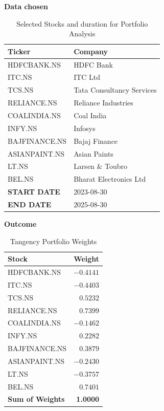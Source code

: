 \textbf{Data chosen}
\begin{table}[H]
        \centering
        \begin{tabular}{ll}
        \toprule
        \textbf{Ticker} & \textbf{Company} \\
        \midrule
        HDFCBANK.NS   & HDFC Bank \\
        ITC.NS        & ITC Ltd \\
        TCS.NS        & Tata Consultancy Services \\
        RELIANCE.NS   & Reliance Industries \\
        COALINDIA.NS  & Coal India \\
        INFY.NS       & Infosys \\
        BAJFINANCE.NS & Bajaj Finance \\
        ASIANPAINT.NS & Asian Paints \\
        LT.NS         & Larsen \& Toubro \\
        BEL.NS        & Bharat Electronics Ltd \\
        \midrule
        \textbf{START DATE} & 2023-08-30\\
        \textbf{END DATE} & 2025-08-30\\
        \bottomrule
    \end{tabular}
    \caption{Selected Stocks and duration for Portfolio Analysis}
\end{table}

\textbf{Outcome}

\begin{table}[H]
    \centering
    \begin{tabular}{lr}
        \toprule
        \textbf{Stock} & \textbf{Weight} \\
        \midrule
        HDFCBANK.NS     & $-0.4141$ \\
        ITC.NS          & $-0.4403$ \\
        TCS.NS          & $0.5232$ \\
        RELIANCE.NS     & $0.7399$ \\
        COALINDIA.NS    & $-0.1462$ \\
        INFY.NS         & $0.2282$ \\
        BAJFINANCE.NS   & $0.3879$ \\
        ASIANPAINT.NS   & $-0.2430$ \\
        LT.NS           & $-0.3757$ \\
        BEL.NS          & $0.7401$ \\
        \midrule
        \textbf{Sum of Weights} & \textbf{1.0000} \\
        \bottomrule
    \end{tabular}
    \caption{Tangency Portfolio Weights}
\end{table}

